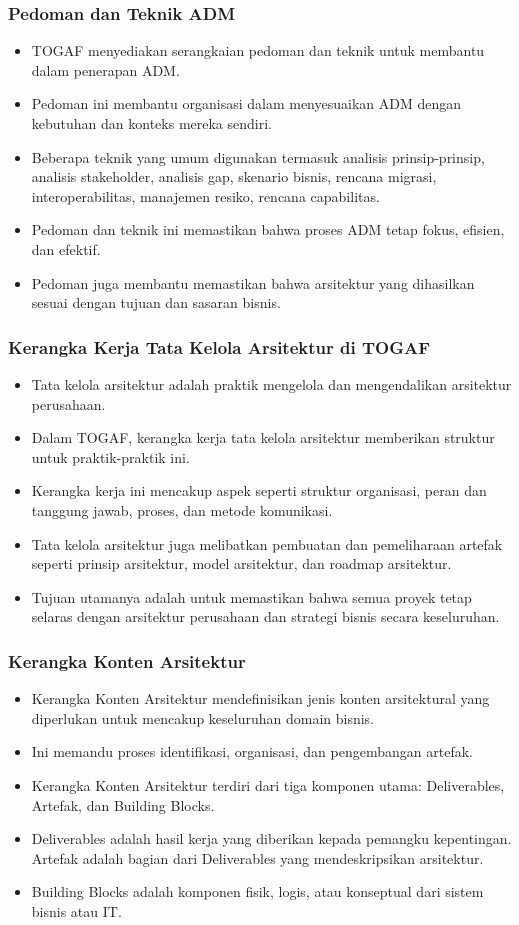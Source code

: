\documentclass[aspectratio=169]{beamer}
\begin{document}
	\begin{frame}
		\frametitle{Pedoman dan Teknik ADM}
		\begin{itemize}
			\item TOGAF menyediakan serangkaian pedoman dan teknik untuk membantu dalam penerapan ADM.
			\item Pedoman ini membantu organisasi dalam menyesuaikan ADM dengan kebutuhan dan konteks mereka sendiri.
			\item Beberapa teknik yang umum digunakan termasuk analisis prinsip-prinsip, analisis stakeholder, analisis gap, skenario bisnis, rencana migrasi, interoperabilitas, manajemen resiko, rencana capabilitas.
			\item Pedoman dan teknik ini memastikan bahwa proses ADM tetap fokus, efisien, dan efektif.
			\item Pedoman juga membantu memastikan bahwa arsitektur yang dihasilkan sesuai dengan tujuan dan sasaran bisnis.
		\end{itemize}
	\end{frame}

	\begin{frame}
		\frametitle{Kerangka Kerja Tata Kelola Arsitektur di TOGAF}
		\begin{itemize}
			\item Tata kelola arsitektur adalah praktik mengelola dan mengendalikan arsitektur perusahaan.
			\item Dalam TOGAF, kerangka kerja tata kelola arsitektur memberikan struktur untuk praktik-praktik ini.
			\item Kerangka kerja ini mencakup aspek seperti struktur organisasi, peran dan tanggung jawab, proses, dan metode komunikasi.
			\item Tata kelola arsitektur juga melibatkan pembuatan dan pemeliharaan artefak seperti prinsip arsitektur, model arsitektur, dan roadmap arsitektur.
			\item Tujuan utamanya adalah untuk memastikan bahwa semua proyek tetap selaras dengan arsitektur perusahaan dan strategi bisnis secara keseluruhan.
		\end{itemize}
	\end{frame}
	
	\begin{frame}
		\frametitle{Kerangka Konten Arsitektur}
		\begin{itemize}
			\item Kerangka Konten Arsitektur mendefinisikan jenis konten arsitektural yang diperlukan untuk mencakup keseluruhan domain bisnis.
			\item Ini memandu proses identifikasi, organisasi, dan pengembangan artefak.
			\item Kerangka Konten Arsitektur terdiri dari tiga komponen utama: Deliverables, Artefak, dan Building Blocks.
			\item Deliverables adalah hasil kerja yang diberikan kepada pemangku kepentingan. Artefak adalah bagian dari Deliverables yang mendeskripsikan arsitektur.
			\item Building Blocks adalah komponen fisik, logis, atau konseptual dari sistem bisnis atau IT.
		\end{itemize}
	\end{frame}
	
\end{document}
